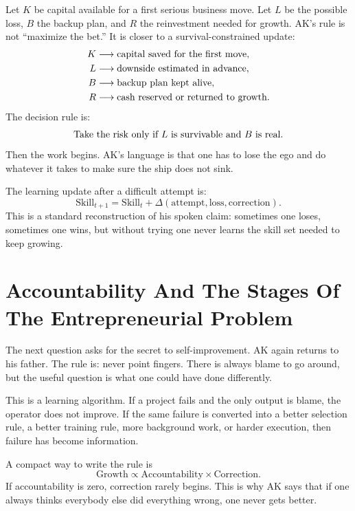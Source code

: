 Let \(K\) be capital available for a first serious business move. Let \(L\) be the possible loss, \(B\) the backup plan, and \(R\) the reinvestment needed for growth. AK's rule is not ``maximize the bet.'' It is closer to a survival-constrained update:
\begin{align}
K &\longrightarrow \hbox{capital saved for the first move},\\
L &\longrightarrow \hbox{downside estimated in advance},\\
B &\longrightarrow \hbox{backup plan kept alive},\\
R &\longrightarrow \hbox{cash reserved or returned to growth}.
\end{align}
The decision rule is:
\begin{equation}
\hbox{Take the risk only if } L \hbox{ is survivable and } B \hbox{ is real.}
\end{equation}
Then the work begins. AK's language is that one has to lose the ego and do whatever it takes to make sure the ship does not sink.

The learning update after a difficult attempt is:
\begin{equation}
\mathrm{Skill}_{t+1}
=
\mathrm{Skill}_{t}
+
\Delta(\mathrm{attempt},\mathrm{loss},\mathrm{correction}).
\end{equation}
This is a standard reconstruction of his spoken claim: sometimes one loses, sometimes one wins, but without trying one never learns the skill set needed to keep growing.

\section{Accountability And The Stages Of The Entrepreneurial Problem}

The next question asks for the secret to self-improvement. AK again returns to his father. The rule is: never point fingers. There is always blame to go around, but the useful question is what one could have done differently.

This is a learning algorithm. If a project fails and the only output is blame, the operator does not improve. If the same failure is converted into a better selection rule, a better training rule, more background work, or harder execution, then failure has become information.

A compact way to write the rule is
\begin{equation}
\mathrm{Growth}
\propto
\mathrm{Accountability}
\times
\mathrm{Correction}.
\end{equation}
If accountability is zero, correction rarely begins. This is why AK says that if one always thinks everybody else did everything wrong, one never gets better.

